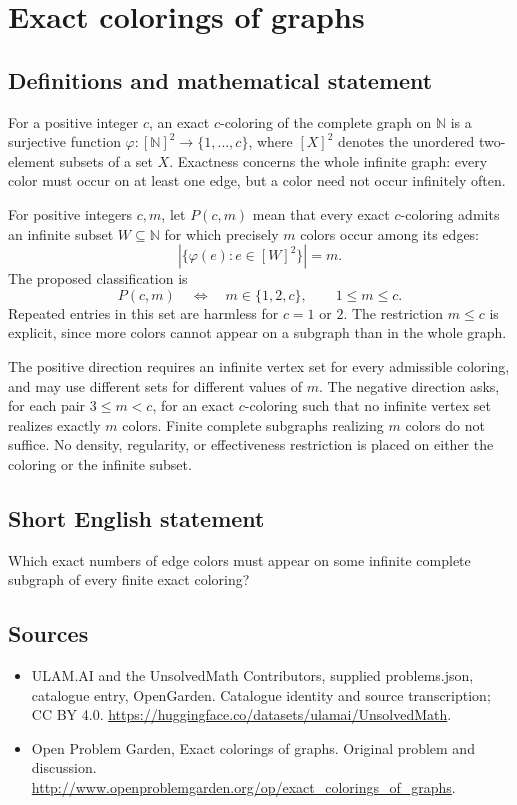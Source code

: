 \documentclass[11pt,a4paper]{article}
\begin{document}
\section*{Exact colorings of graphs}\label{statement}

\subsection{Definitions and mathematical statement}
For a positive integer $c$, an exact $c$-coloring of the complete graph on $\mathbb N$ is a surjective function $\varphi:[\mathbb N]^2\to\{1,\ldots,c\}$, where $[X]^2$ denotes the unordered two-element subsets of a set $X$. Exactness concerns the whole infinite graph: every color must occur on at least one edge, but a color need not occur infinitely often.

For positive integers $c,m$, let $P(c,m)$ mean that every exact $c$-coloring admits an infinite subset $W\subseteq\mathbb N$ for which precisely $m$ colors occur among its edges:
\[
 \left|\{\varphi(e):e\in[W]^2\}\right|=m.
\]
The proposed classification is
\[
 P(c,m)\quad\Longleftrightarrow\quad m\in\{1,2,c\},
 \qquad 1\le m\le c.
\]
Repeated entries in this set are harmless for $c=1$ or $2$. The restriction $m\le c$ is explicit, since more colors cannot appear on a subgraph than in the whole graph.

The positive direction requires an infinite vertex set for every admissible coloring, and may use different sets for different values of $m$. The negative direction asks, for each pair $3\le m<c$, for an exact $c$-coloring such that no infinite vertex set realizes exactly $m$ colors. Finite complete subgraphs realizing $m$ colors do not suffice. No density, regularity, or effectiveness restriction is placed on either the coloring or the infinite subset.
\subsection{Short English statement}
Which exact numbers of edge colors must appear on some infinite complete subgraph of every finite exact coloring?
\subsection{Sources}
\begin{itemize}
\item[S1] ULAM.AI and the UnsolvedMath Contributors, supplied problems.json, catalogue entry, OpenGarden. Catalogue identity and source transcription; CC BY 4.0.
\url{https://huggingface.co/datasets/ulamai/UnsolvedMath}.
\item[S2] Open Problem Garden, Exact colorings of graphs. Original problem and discussion.
\url{http://www.openproblemgarden.org/op/exact_colorings_of_graphs}.
\end{itemize}
\end{document}
